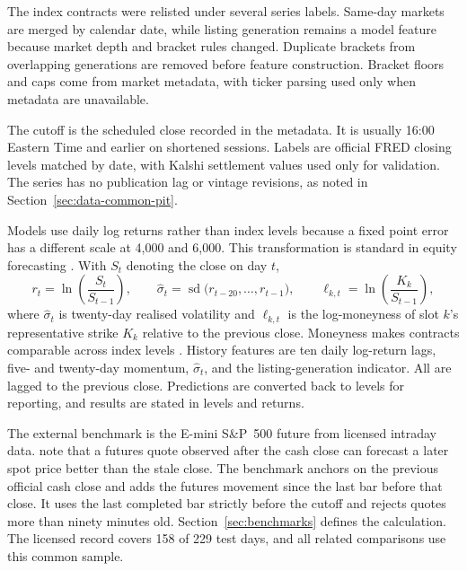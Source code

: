 \documentclass[12pt,a4paper]{report}
\begin{document}
The index contracts were relisted under several series labels. Same-day markets
are merged by calendar date, while listing generation remains a model feature
because market depth and bracket rules changed. Duplicate brackets from
overlapping generations are removed before feature construction. Bracket
floors and caps come from market metadata, with ticker parsing used only when
metadata are unavailable.

The cutoff is the scheduled close recorded in the metadata. It is usually
16:00 Eastern Time and earlier on shortened sessions. Labels are official FRED
closing levels matched by date, with Kalshi settlement values used only for
validation. The series has no publication lag or vintage revisions, as noted
in Section~\ref{sec:data-common-pit}.

Models use daily log returns rather than index levels because a fixed point
error has a different scale at 4{,}000 and 6{,}000. This transformation is
standard in equity forecasting \parencite{rapach2013}. With $S_t$ denoting the
close on day $t$,
\begin{equation}
\label{eq:logret}
r_t = \ln\!\left(\frac{S_t}{S_{t-1}}\right),
\qquad
\hat{\sigma}_t = \operatorname{sd}\bigl(r_{t-20},\dots,r_{t-1}\bigr),
\qquad
\ell_{k,t} = \ln\!\left(\frac{K_k}{S_{t-1}}\right),
\end{equation}
where $\hat{\sigma}_t$ is twenty-day realised volatility and $\ell_{k,t}$ is
the log-moneyness of slot $k$'s representative strike $K_k$ relative to the previous
close. Moneyness makes contracts comparable across index levels
\parencite{christoffersen2013}. History features are ten daily log-return lags,
five- and twenty-day momentum, $\hat{\sigma}_t$, and the listing-generation
indicator. All are lagged to the previous close. Predictions are converted
back to levels for reporting, and results are stated in levels and returns.

The external benchmark is the E-mini S\&P~500 future from licensed intraday
data. \textcite{christoffersen2013} note that a futures quote observed after
the cash close can forecast a later spot price better than the stale close.
The benchmark anchors on the previous official cash close and adds the futures
movement since the last bar before that close. It uses the last completed bar
strictly before the cutoff and rejects quotes more than ninety minutes old.
Section~\ref{sec:benchmarks} defines the calculation. The licensed record
covers 158 of 229 test days, and all related comparisons use this common
sample.
\end{document}
